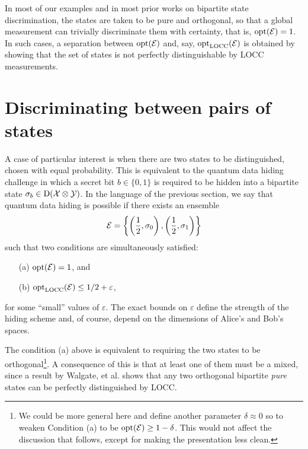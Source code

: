 In most of our examples and in most prior works on bipartite state discrimination, 
the states are taken to be pure and orthogonal, so that a global measurement can 
trivially discriminate them with certainty, that is, $\operatorname{opt}(\mathcal{E}) = 1$.
In such cases, a separation between $\operatorname{opt}(\mathcal{E})$ and, say, $\operatorname{opt}_{\mathrm{LOCC}}(\mathcal{E})$ is obtained 
by showing that the set of states is not perfectly distinguishable by LOCC measurements.


\section{Discriminating between pairs of states}
A case of particular interest is when there are two states to be distinguished,
chosen with equal probability. 
This is equivalent to the quantum data hiding challenge in which a secret bit 
$b \in \{0,1\}$ is required to be hidden into a bipartite state 
$\sigma_{b}\in\mathrm{D}(\mathcal{X}\otimes\mathcal{Y})$. In the language of the previous section, 
we say that quantum data hiding is possible if there exists an ensemble
\begin{equation}
\mathcal{E} = \left\{\left(\frac{1}{2},\sigma_{0}\right),
        \left(\frac{1}{2},\sigma_{1}\right)\right\}
\end{equation}
such that two conditions are simultaneously satisfied:
\begin{itemize}
\item[(a)] $\operatorname{opt}(\mathcal{E}) = 1$, and
\item[(b)] $\operatorname{opt}_{\mathrm{LOCC}}(\mathcal{E}) \leq 1/2 + \varepsilon$,
\end{itemize}
for some ``small'' values of $\varepsilon$. The exact bounds on 
$\varepsilon$ define the strength of the hiding scheme and, 
of course, depend on the dimensions of Alice's and Bob's spaces.

The condition (a) above is equivalent to requiring the two states to be 
orthogonal\footnote{We could be more general here and define another parameter
$\delta \approx 0$ so to weaken Condition (a) to be $\operatorname{opt}(\mathcal{E}) \geq 1 - \delta$.
This would not affect the discussion that follows, except for making the 
presentation less clean.}.
A consequence of this is that at least one of them must be a mixed,
since a result by Walgate, et al. \cite{Walgate00} shows that any two orthogonal 
bipartite \emph{pure} states can be perfectly distinguished by LOCC.

